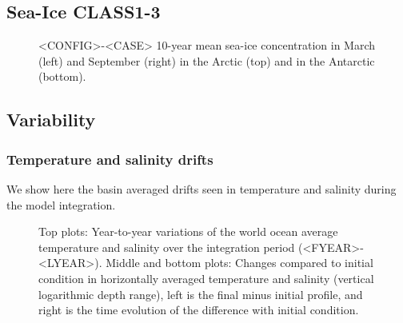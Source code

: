 \documentclass[12pt]{article}
\begin{document}
\subsection{Sea-Ice CLASS1-3}

\begin{figure}[H]
\begin{center}
\begin{minipage}{0.47\linewidth}
\end{minipage}
\hfill
\begin{minipage}{0.47\linewidth}
\end{minipage}
\begin{minipage}{0.47\linewidth}
\end{minipage}
\hfill
\begin{minipage}{0.47\linewidth}
\end{minipage}
\caption{<CONFIG>-<CASE> 10-year mean sea-ice concentration in March (left) and September (right) in the Arctic (top) and in the Antarctic (bottom).}
\end{center}
\end{figure}

\subsection{Variability}

\subsubsection{Temperature and salinity drifts}

We show here the basin averaged drifts seen in temperature and salinity during the model integration.

\begin{figure}[H]
\begin{center}
\caption{Top plots: Year-to-year variations of the world ocean average temperature and salinity over the integration period (<FYEAR>-<LYEAR>). Middle and bottom plots: Changes compared to initial condition in horizontally averaged temperature and salinity (vertical logarithmic depth range), left is the final minus initial profile, and right is the time evolution of the difference with initial condition.}
\end{center}
\end{figure}
\end{document}

